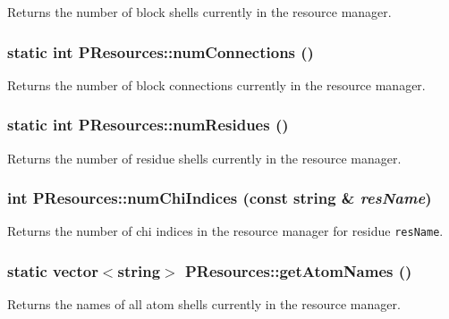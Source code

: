 Returns the number of block shells currently in the resource manager. 
\subsubsection{\setlength{\rightskip}{0pt plus 5cm}static int PResources::num\-Connections ()\hspace{0.3cm}{\tt  [inline, static]}}\label{classPResources_0215329af6b0645548c56a026469f481}


Returns the number of block connections currently in the resource manager. 
\subsubsection{\setlength{\rightskip}{0pt plus 5cm}static int PResources::num\-Residues ()\hspace{0.3cm}{\tt  [inline, static]}}\label{classPResources_11677ae9611346d8c0a366859a95678e}


Returns the number of residue shells currently in the resource manager. 
\subsubsection{\setlength{\rightskip}{0pt plus 5cm}int PResources::num\-Chi\-Indices (const string \& {\em res\-Name})\hspace{0.3cm}{\tt  [static]}}\label{classPResources_1d4f8b6ec2d790c2b70ebc9bb955b4d4}


Returns the number of chi indices in the resource manager for residue {\tt res\-Name}. 
\subsubsection{\setlength{\rightskip}{0pt plus 5cm}static vector$<$string$>$ PResources::get\-Atom\-Names ()\hspace{0.3cm}{\tt  [inline, static]}}\label{classPResources_95fb6b718a2ce82e8bd3b82624c93cb0}


Returns the names of all atom shells currently in the resource manager. 
